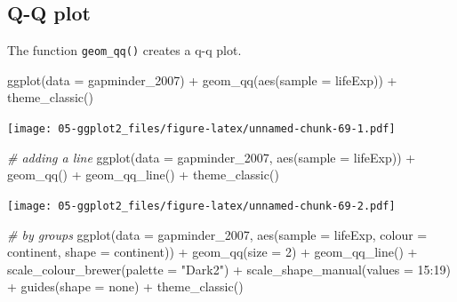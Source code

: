 \documentclass[
]{book}
\newenvironment{Shaded}{\begin{snugshade}}{\end{snugshade}}
\newcommand{\AttributeTok}[1]{\textcolor[rgb]{0.77,0.63,0.00}{#1}}
\newcommand{\CommentTok}[1]{\textcolor[rgb]{0.56,0.35,0.01}{\textit{#1}}}
\newcommand{\DecValTok}[1]{\textcolor[rgb]{0.00,0.00,0.81}{#1}}
\newcommand{\FunctionTok}[1]{\textcolor[rgb]{0.00,0.00,0.00}{#1}}
\newcommand{\NormalTok}[1]{#1}
\newcommand{\SpecialCharTok}[1]{\textcolor[rgb]{0.00,0.00,0.00}{#1}}
\newcommand{\StringTok}[1]{\textcolor[rgb]{0.31,0.60,0.02}{#1}}
\begin{document}
\hypertarget{q-q-plot}{%
\subsection{Q-Q plot}\label{q-q-plot}}

The function \texttt{geom\_qq()} creates a q-q plot.

\begin{Shaded}
\begin{Highlighting}[]
\FunctionTok{ggplot}\NormalTok{(}\AttributeTok{data =}\NormalTok{ gapminder\_2007) }\SpecialCharTok{+} 
\FunctionTok{geom\_qq}\NormalTok{(}\FunctionTok{aes}\NormalTok{(}\AttributeTok{sample =}\NormalTok{ lifeExp)) }\SpecialCharTok{+}
\FunctionTok{theme\_classic}\NormalTok{()}
\end{Highlighting}
\end{Shaded}

\texttt{[image: 05-ggplot2\_files/figure-latex/unnamed-chunk-69-1.pdf]}

\begin{Shaded}
\begin{Highlighting}[]


\CommentTok{\# adding a line}
\FunctionTok{ggplot}\NormalTok{(}\AttributeTok{data =}\NormalTok{ gapminder\_2007, }\FunctionTok{aes}\NormalTok{(}\AttributeTok{sample =}\NormalTok{ lifeExp)) }\SpecialCharTok{+} 
   \FunctionTok{geom\_qq}\NormalTok{() }\SpecialCharTok{+} 
   \FunctionTok{geom\_qq\_line}\NormalTok{() }\SpecialCharTok{+}
   \FunctionTok{theme\_classic}\NormalTok{()}
\end{Highlighting}
\end{Shaded}

\texttt{[image: 05-ggplot2\_files/figure-latex/unnamed-chunk-69-2.pdf]}

\begin{Shaded}
\begin{Highlighting}[]


\CommentTok{\# by groups}
\FunctionTok{ggplot}\NormalTok{(}\AttributeTok{data =}\NormalTok{ gapminder\_2007, }\FunctionTok{aes}\NormalTok{(}\AttributeTok{sample =}\NormalTok{ lifeExp, }\AttributeTok{colour =}\NormalTok{ continent, }\AttributeTok{shape =}\NormalTok{ continent)) }\SpecialCharTok{+} 
   \FunctionTok{geom\_qq}\NormalTok{(}\AttributeTok{size =} \DecValTok{2}\NormalTok{) }\SpecialCharTok{+} 
   \FunctionTok{geom\_qq\_line}\NormalTok{() }\SpecialCharTok{+}
   \FunctionTok{scale\_colour\_brewer}\NormalTok{(}\AttributeTok{palette =} \StringTok{"Dark2"}\NormalTok{) }\SpecialCharTok{+}
   \FunctionTok{scale\_shape\_manual}\NormalTok{(}\AttributeTok{values =} \DecValTok{15}\SpecialCharTok{:}\DecValTok{19}\NormalTok{) }\SpecialCharTok{+}
   \FunctionTok{guides}\NormalTok{(}\AttributeTok{shape =} \StringTok{\textquotesingle{}none\textquotesingle{}}\NormalTok{) }\SpecialCharTok{+}
   \FunctionTok{theme\_classic}\NormalTok{()}
\end{Highlighting}
\end{Shaded}
\end{document}

